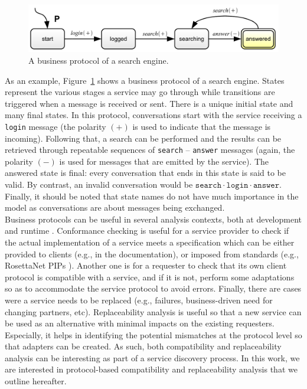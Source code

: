 \begin{figure}[htbp]
    \centering
    \includegraphics[width=\textwidth]{content/web-services/business-protocol}
    \caption{A business protocol of a search engine.} 
    \label{fig:business-protocol}
\end{figure}

As an example, Figure~\ref{fig:business-protocol} shows a business protocol of a search engine. States represent the various stages a service may go through while transitions are triggered when a message is received or sent. There is a unique initial state and many final states. In this protocol, conversations start with the service receiving a \texttt{login} message (the polarity $(+)$ is used to indicate that the message is incoming). Following that, a search can be performed and the results can be retrieved through repeatable sequences of \texttt{search} -- \texttt{answer} messages (again, the polarity $(-)$ is used for messages that are emitted by the service). The \textsf{answered} state is final: every conversation that ends in this state is said to be valid. By contrast, an invalid conversation would be $\mathtt{search} \cdot \mathtt{login} \cdot \mathtt{answer}$. Finally, it should be noted that state names do not have much importance in the model as conversations are about messages being exchanged.\\

Business protocols can be useful in several analysis contexts, both at development and runtime \cite{FTBB,BBFC04,BCT-CAISE03,KBBB+04}. Conformance checking is useful for a service provider to check if the actual implementation of a service meets a specification which can be either provided to clients (e.g., in the documentation), or imposed from standards (e.g., RosettaNet PIPs \cite{ROSETTANET}). Another one is for a requester to check that its own client protocol is compatible with a service, and if it is not, perform some adaptations so as to accommodate the service protocol to avoid errors. Finally, there are cases were a service needs to be replaced (e.g., failures, business-driven need for changing partners, etc). Replaceability analysis is useful so that a new service can be used as an alternative with minimal impacts on the existing requesters. Especially, it helps in identifying the potential mismatches at the protocol level so that adapters can be created. As such, both compatibility and replaceability analysis can be interesting as part of a service discovery process. In this work, we are interested in protocol-based compatibility and replaceability analysis that we outline hereafter.

